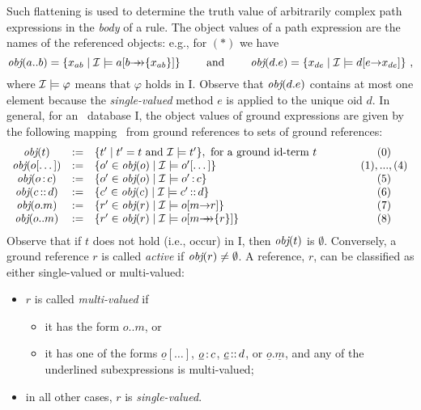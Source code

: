 Such flattening is used to determine the truth value of
arbitrarily complex path expressions in the \emph{body} of a rule.
The object values \obj of a path expression are
the names of the referenced objects: e.g., for $(*)$ we have
\begin{displaymath}
\textit{obj}(a..b) = \{x_{ab} \mid \mathcal{I} \models a[b{\rightarrow\!\!\!\!\rightarrow}\{x_{ab}\}]\}
\qquad\textrm{ and }\qquad \textit{obj}(d.e) = \{x_{de} \mid \mathcal{I} \models d[e{\rightarrow} 
x_{de}]\} ~,
\end{displaymath}
%
where $\mathcal{I} \models \varphi$ means that $\varphi$ holds in \db I.
Observe that $\textit{obj}(d.e)$ contains at most one element because the
\emph{single-valued} method $e$ is applied to the unique oid $d$.  In
general, for an \fl\ database \db I, the object values of ground
expressions are given by the following mapping \obj\ from ground
references to sets of ground references:
%
\begin{displaymath}
  \begin{array}{cll@{\hspace{4em}}c}
    \obj(t) & := & \{t' \mid t'=t \textrm{ and } \db I\models t' \}, 
     \textrm{ for a ground id-term $t$}  & (0) \\   
    \obj(o[\dots]) & :=& \{o'\in\obj(o) \mid \db I \models o'[\dots]
    \}& (1),...,(4)\\  
    \obj(o\isa c) & := & \{o'\in\obj(o) \mid \db I \models o'\isa c\} &
    (5) \\ 
    \obj(c\subcl d) & := & \{c'\in\obj(c) \mid \db I \models c'\subcl
    d\} &  (6)\\ 
    \obj(o.m) & :=  & \{r'\in\obj(r) \mid \db I \models o[m\fd
    r]\}  &  (7)\\ 
    \obj(o..m) & := &  \{ r'\in\obj(r) \mid \db I \models
    o[m{\mvd}\{r\}] \} & (8)   
  \end{array}
\end{displaymath}
Observe that if $t$ does not hold (i.e., occur) in \db I, then $\textit{obj}(t)$ is
$\emptyset$.  Conversely, a ground reference $r$ is called \emph{active} if
$\textit{obj}(r)\neq\emptyset$. A reference, $r$, can be classified as either
single-valued or multi-valued:
\begin{itemize}
\item $r$ is called \emph{multi-valued} if
 \begin{itemize}
  \item it has the form $o..m$, or 
  \item it has one of the forms $\underline{o}[\dots]$,
    $\underline{o}\,{\bf{:}}\, c$, $\underline{c}\,{\bf{::}}\, d$, or
    $\underline{o}.\underline{m}$, and any of the underlined
    subexpressions is multi-valued;
 \end{itemize}
\item in all other cases, $r$ is \emph{single-valued}.
\end{itemize}



